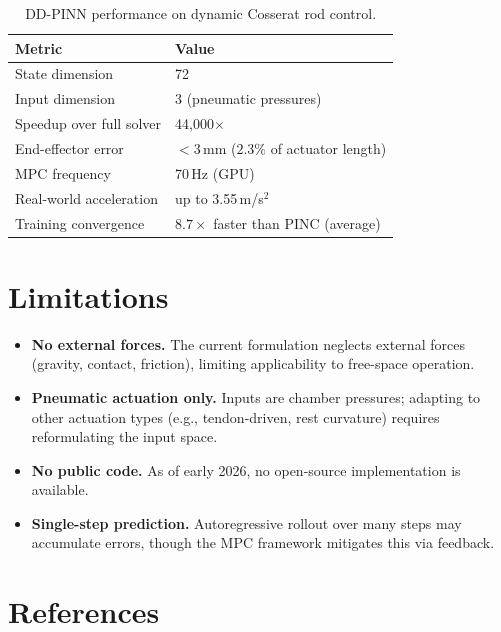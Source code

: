 \documentclass[11pt]{article}
\begin{document}
\begin{table}[H]
\centering
\caption{DD-PINN performance on dynamic Cosserat rod control.}
\label{tab:results}
\begin{tabular}{@{}ll@{}}
\toprule
\textbf{Metric} & \textbf{Value} \\
\midrule
State dimension & 72 \\
Input dimension & 3 (pneumatic pressures) \\
Speedup over full solver & 44,000$\times$ \\
End-effector error & $<\!3$\,mm ($2.3\%$ of actuator length) \\
MPC frequency & 70\,Hz (GPU) \\
Real-world acceleration & up to 3.55\,m/s$^2$ \\
Training convergence & $8.7\times$ faster than PINC (average) \\
\bottomrule
\end{tabular}
\end{table}

\section{Limitations}

\begin{itemize}
    \item \textbf{No external forces.} The current formulation neglects external forces (gravity, contact, friction), limiting applicability to free-space operation.
    \item \textbf{Pneumatic actuation only.} Inputs are chamber pressures; adapting to other actuation types (e.g., tendon-driven, rest curvature) requires reformulating the input space.
    \item \textbf{No public code.} As of early 2026, no open-source implementation is available.
    \item \textbf{Single-step prediction.} Autoregressive rollout over many steps may accumulate errors, though the MPC framework mitigates this via feedback.
\end{itemize}

\section*{References}
\end{document}
